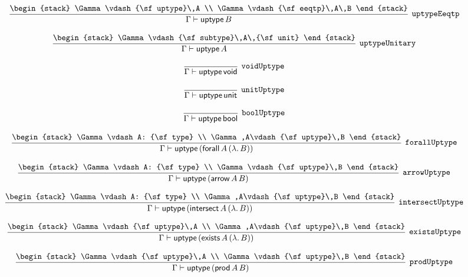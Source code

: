 \[
\infer[{\tt uptypeEeqtp}]{\Gamma \vdash {\sf uptype}\,B}{
\begin{stack}
\Gamma \vdash {\sf uptype}\,A
\\
\Gamma \vdash {\sf eeqtp}\,A\,B
\end{stack}}
\]

\[
\infer[{\tt uptypeUnitary}]{\Gamma \vdash {\sf uptype}\,A}{
\begin{stack}
\Gamma \vdash {\sf subtype}\,A\,{\sf unit}
\end{stack}}
\]

\[
\infer[{\tt voidUptype}]{\Gamma \vdash {\sf uptype}\,{\sf void}}{}
\]

\[
\infer[{\tt unitUptype}]{\Gamma \vdash {\sf uptype}\,{\sf unit}}{}
\]

\[
\infer[{\tt boolUptype}]{\Gamma \vdash {\sf uptype}\,{\sf bool}}{}
\]

\[
\infer[{\tt forallUptype}]{\Gamma \vdash {\sf uptype}\,({\sf forall}\,A\,(\lambda .\,B))}{
\begin{stack}
\Gamma \vdash A: {\sf type}
\\
\Gamma ,A\vdash {\sf uptype}\,B
\end{stack}}
\]

\[
\infer[{\tt arrowUptype}]{\Gamma \vdash {\sf uptype}\,({\sf arrow}\,A\,B)}{
\begin{stack}
\Gamma \vdash A: {\sf type}
\\
\Gamma \vdash {\sf uptype}\,B
\end{stack}}
\]

\[
\infer[{\tt intersectUptype}]{\Gamma \vdash {\sf uptype}\,({\sf intersect}\,A\,(\lambda .\,B))}{
\begin{stack}
\Gamma \vdash A: {\sf type}
\\
\Gamma ,A\vdash {\sf uptype}\,B
\end{stack}}
\]

\[
\infer[{\tt existsUptype}]{\Gamma \vdash {\sf uptype}\,({\sf exists}\,A\,(\lambda .\,B))}{
\begin{stack}
\Gamma \vdash {\sf uptype}\,A
\\
\Gamma ,A\vdash {\sf uptype}\,B
\end{stack}}
\]

\[
\infer[{\tt prodUptype}]{\Gamma \vdash {\sf uptype}\,({\sf prod}\,A\,B)}{
\begin{stack}
\Gamma \vdash {\sf uptype}\,A
\\
\Gamma \vdash {\sf uptype}\,B
\end{stack}}
\]

